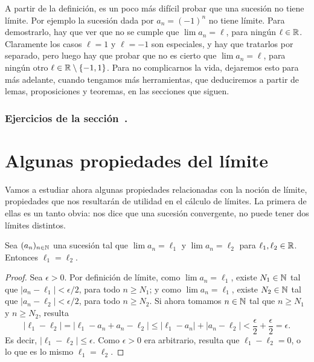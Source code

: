 \begin{example}
    A partir de la definición, es un poco más difícil probar que una sucesión no tiene límite. Por ejemplo la sucesión dada por $a_n=(-1)^n$ no tiene límite. Para demostrarlo, hay que ver que no se cumple que $\lim a_n = \ell$, para ningún $\ell\in\mathbb{R}$.
    Claramente los casos $\ell=1$ y $\ell=-1$ son especiales, y hay que tratarlos por separado, pero luego hay que probar que no es cierto que $\lim a_n = \ell$, para ningún otro $\ell \in \mathbb{R}\setminus\{-1,1\}$. 
    Para no complicarnos la vida, dejaremos esto para más adelante, cuando tengamos más herramientas, que deduciremos a partir de lemas, proposiciones y teoremas, en las secciones que siguen.
\end{example}


\subsubsection*{Ejercicios de la sección~.}


\begin{enumerate}

\end{enumerate}

\section{Algunas propiedades del límite}

Vamos a estudiar ahora algunas propiedades relacionadas con la noción de límite, propiedades que nos resultarán de utilidad en el cálculo de límites. La primera de ellas es un tanto obvia: nos dice que una sucesión convergente, no puede tener dos límites distintos.

\begin{proposition}
    Sea $(a_n)_{n\in\mathbb{N}}$ una sucesión tal que $\lim a_n = \ell_1$ y $\lim a_n = \ell_2$ para $\ell_1,\ell_2\in \mathbb{R}$. Entonces $\ell_1 = \ell_2$.
\end{proposition}

\begin{proof}
    Sea $\epsilon>0$. Por definición de límite, como $\lim a_n = \ell_1$, existe $N_1\in\mathbb{N}$ tal que $|a_n-\ell_1|<\epsilon/2$, para todo $n\ge N_1$; y como $\lim a_n = \ell_1$, existe $N_2\in\mathbb{N}$ tal que $|a_n-\ell_2|<\epsilon/2$, para todo $n\ge N_2$.
    Si ahora tomamos $n\in\mathbb{N}$ tal que $n\ge N_1$ y $n\ge N_2$, resulta
    \[
    |\ell_1 - \ell_2| 
    =
    |\ell_1 - a_n + a_n - \ell_2| 
    \le
    |\ell_1 - a_n | + | a_n - \ell_2| 
    < \frac\epsilon2 + \frac\epsilon2 = \epsilon.
    \]
    Es decir, $|\ell_1 - \ell_2| \le \epsilon$. Como $\epsilon>0$ era arbitrario, resulta que $\ell_1-\ell_2 = 0$, o lo que es lo mismo $\ell_1 = \ell_2$.
\end{proof}

